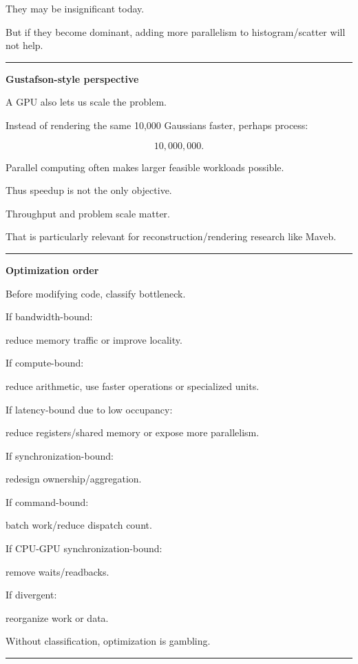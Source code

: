 They may be insignificant today.

But if they become dominant, adding more parallelism to histogram/scatter will not help.

\begin{center}\rule{0.5\linewidth}{0.5pt}\end{center}

\textbf{Gustafson-style perspective}

A GPU also lets us scale the problem.

Instead of rendering the same 10,000 Gaussians faster, perhaps process:

\[
10,000,000.
\]

Parallel computing often makes larger feasible workloads possible.

Thus speedup is not the only objective.

Throughput and problem scale matter.

That is particularly relevant for reconstruction/rendering research like Maveb.

\begin{center}\rule{0.5\linewidth}{0.5pt}\end{center}

\textbf{Optimization order}

Before modifying code, classify bottleneck.

If bandwidth-bound:

reduce memory traffic or improve locality.

If compute-bound:

reduce arithmetic, use faster operations or specialized units.

If latency-bound due to low occupancy:

reduce registers/shared memory or expose more parallelism.

If synchronization-bound:

redesign ownership/aggregation.

If command-bound:

batch work/reduce dispatch count.

If CPU-GPU synchronization-bound:

remove waits/readbacks.

If divergent:

reorganize work or data.

Without classification, optimization is gambling.

\begin{center}\rule{0.5\linewidth}{0.5pt}\end{center}

